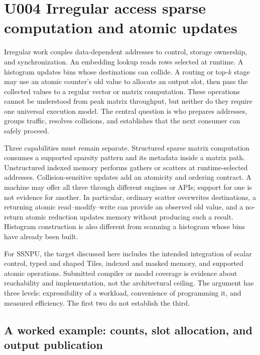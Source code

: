 \section{U004 Irregular access sparse computation and atomic updates}
\label{sec:u004}

Irregular work couples data-dependent addresses to control, storage ownership, and synchronization. An embedding lookup reads rows selected at runtime. A histogram updates bins whose destinations can collide. A routing or top-$k$ stage may use an atomic counter's old value to allocate an output slot, then pass the collected values to a regular vector or matrix computation. These operations cannot be understood from peak matrix throughput, but neither do they require one universal execution model. The central question is who prepares addresses, groups traffic, resolves collisions, and establishes that the next consumer can safely proceed.

Three capabilities must remain separate. Structured sparse matrix computation consumes a supported sparsity pattern and its metadata inside a matrix path. Unstructured indexed memory performs gathers or scatters at runtime-selected addresses. Collision-sensitive updates add an atomicity and ordering contract. A machine may offer all three through different engines or APIs; support for one is not evidence for another. In particular, ordinary scatter overwrites destinations, a returning atomic read--modify--write can provide an observed old value, and a no-return atomic reduction updates memory without producing such a result. Histogram construction is also different from scanning a histogram whose bins have already been built.

For SSNPU, the target discussed here includes the intended integration of scalar control, typed and shaped Tiles, indexed and masked memory, and supported atomic operations. Submitted compiler or model coverage is evidence about reachability and implementation, not the architectural ceiling. The argument has three levels: expressibility of a workload, convenience of programming it, and measured efficiency. The first two do not establish the third.

\subsection{A worked example: counts, slot allocation, and output publication}

